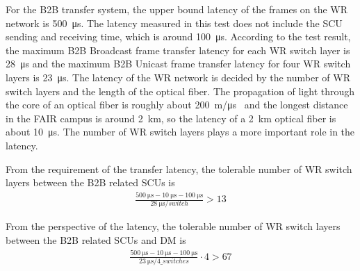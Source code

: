 
For the B2B transfer system, the upper bound latency of the frames on the WR network is \SI{500}{\us}. The latency measured in this test does not include the SCU sending and receiving time, which is around \SI{100}{\us}. According to the test result, the maximum B2B Broadcast frame transfer latency for each WR switch layer is \SI{28}{\micro\second} and the maximum B2B Unicast frame transfer latency for four WR switch layers is  \SI{23}{\micro\second}. The latency of the WR network is decided by the number of WR switch layers and the length of the optical fiber. The propagation of light through the core of an optical fiber is roughly about \SI{200}{\meter/\us}~\cite{noauthor_calculating_2012} and the longest distance in the FAIR campus is around \SI{2}{\kilo\meter}, so the latency of a \SI{2}{\kilo\meter} optical fiber is about \SI{10}{\us}. The number of WR switch layers plays a more important role in the latency. 

From the requirement of the transfer latency, the tolerable number of WR switch layers between the B2B related \gls{SCU}s is 
		\begin{equation}
		\begin{aligned}
			\frac{\SI{500}{\us}-\SI{10}{\us}-\SI{100}{\us}}{\SI{28}{\us/switch}}>13
		\label {num_switch_b}
		\end{aligned}
		\end{equation}

From the perspective of the latency, the tolerable number of WR switch layers between the B2B related \gls{SCU}s and DM is
		\begin{equation}
		\begin{aligned}
			\frac{\SI{500}{\us}-\SI{10}{\us}-\SI{100}{\us}}{\SI{23}{\us/4\_switches}}\cdot 4 > 67
		\label {num_switch_b}
		\end{aligned}
		\end{equation}

